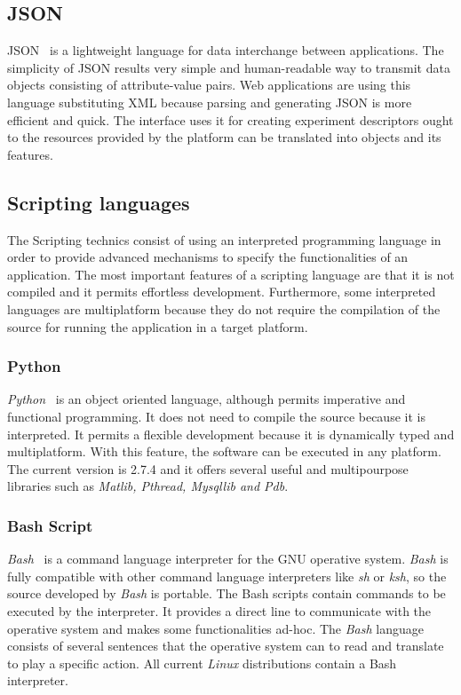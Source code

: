 \subsection{JSON}

\ac{JSON}~\cite{Organization} is a lightweight language for data interchange between applications. The
simplicity of \ac{JSON} results very simple and human-readable way to transmit data
objects consisting of attribute-value pairs. Web applications are using this
language substituting \ac{XML} because parsing and generating \ac{JSON} is more efficient
and quick. The \bonfire interface uses it for creating experiment descriptors
ought to the resources provided by the platform can be translated into objects
and its features.

\subsection{Scripting languages}

The Scripting technics consist of using an interpreted programming language in
order to provide advanced mechanisms to specify the functionalities of an
application. The most important features of a scripting language are that it is not
compiled and it permits effortless development. Furthermore, some interpreted languages
are multiplatform because they do not require the compilation of the source for
running the application in a target platform.


\subsubsection{Python}
\emph{Python}~\cite{Foundation2014} is an object oriented language, although permits imperative and functional
programming. It does not need to compile the source because it is
interpreted. It permits a flexible development because it is dynamically typed
and multiplatform. With this feature, the software can be
executed in any platform. The current version is 2.7.4 and it offers several
useful and multipourpose libraries such as \emph{Matlib, Pthread, Mysqllib and Pdb}.

\subsubsection{Bash Script}

\emph{Bash}~\cite{Cooper2014} is a command language interpreter for the \ac{GNU}
operative system. \emph{Bash} is fully compatible with other command language
interpreters like \emph{sh} or \emph{ksh}, so the source developed by
\emph{Bash} is portable. The Bash scripts contain
commands  to be executed by the interpreter. It provides a direct line
to communicate with the operative system and makes some functionalities ad-hoc.
The \emph{Bash} language consists of several sentences that the operative system
can to read and translate to play a specific action. All current \emph{Linux} distributions contain a Bash interpreter.

